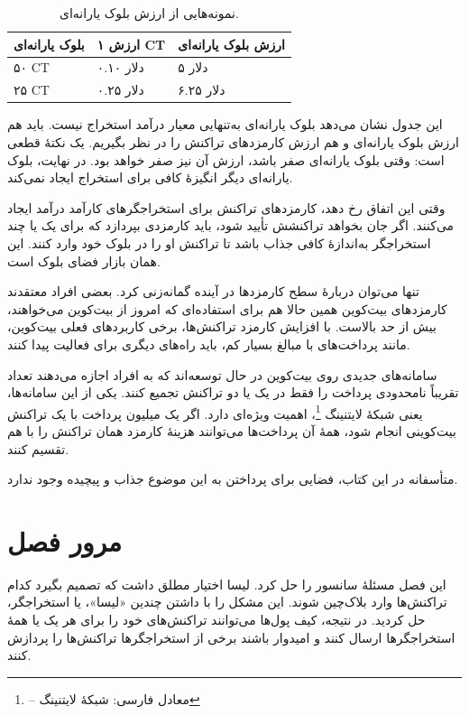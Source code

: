 \documentclass[oneside,a4paper,12pt]{book}
\newcommand{\پاورقی}[2]{%
  \footnote{%
    \scriptsize
    \setlength{\parindent}{0pt}%
    \setlength{\parskip}{0pt}%
    \lr{#1} -- معادل فارسی: #2%
  }}
\newcommand{\قاب}[3][]{%
  \begin{center}
  \fbox{\begin{minipage}{0.78\textwidth}
  \begin{flushright}
  \textbf{#2}\par\smallskip
  #3
  \end{flushright}
  \end{minipage}}
  \end{center}}
\begin{document}
\begin{table}[htbp]
\centering
\caption{نمونه‌هایی از ارزش بلوک یارانه‌ای.}
\label{tab:ch7:4}
{\small\setlength{\tabcolsep}{3pt}
\renewcommand{\arraystretch}{1.2}
\begin{tabular}{|>{\centering\arraybackslash}p{}|>{\centering\arraybackslash}p{}|>{\centering\arraybackslash}p{}|}
\hline
\textbf{بلوک یارانه‌ای} & \textbf{ارزش ۱ CT} & \textbf{ارزش بلوک یارانه‌ای} \\ \hline
۵۰ CT & ۰.۱۰ دلار & ۵ دلار \\ \hline
۲۵ CT & ۰.۲۵ دلار & ۶.۲۵ دلار \\ \hline
\end{tabular}
}
\end{table}
این جدول نشان می‌دهد بلوک یارانه‌ای به‌تنهایی معیار درآمد استخراج نیست. باید هم ارزش بلوک یارانه‌ای و هم ارزش کارمزدهای تراکنش را در نظر بگیریم. یک نکتهٔ قطعی است: وقتی بلوک یارانه‌ای صفر باشد، ارزش آن نیز صفر خواهد بود. در نهایت، بلوک یارانه‌ای دیگر انگیزهٔ کافی برای استخراج ایجاد نمی‌کند.

وقتی این اتفاق رخ دهد، کارمزدهای تراکنش برای استخراجگرهای کارآمد درآمد ایجاد می‌کنند. اگر جان بخواهد تراکنشش تأیید شود، باید کارمزدی بپردازد که برای یک یا چند استخراجگر به‌اندازهٔ کافی جذاب باشد تا تراکنش او را در بلوک خود وارد کنند. این همان بازار فضای بلوک است.

تنها می‌توان دربارهٔ سطح کارمزدها در آینده گمانه‌زنی کرد. بعضی افراد معتقدند کارمزدهای بیت‌کوین همین حالا هم برای استفاده‌ای که امروز از بیت‌کوین می‌خواهند، بیش از حد بالاست. با افزایش کارمزد تراکنش‌ها، برخی کاربردهای فعلی بیت‌کوین، مانند پرداخت‌های با مبالغ بسیار کم، باید راه‌های دیگری برای فعالیت پیدا کنند.

سامانه‌های جدیدی روی بیت‌کوین در حال توسعه‌اند که به افراد اجازه می‌دهند تعداد تقریباً نامحدودی پرداخت را فقط در یک یا دو تراکنش تجمیع کنند. یکی از این سامانه‌ها، یعنی شبکهٔ لایتنینگ\پاورقی{Lightning Network}{شبکهٔ لایتنینگ}، اهمیت ویژه‌ای دارد. اگر یک میلیون پرداخت با یک تراکنش بیت‌کوینی انجام شود، همهٔ آن پرداخت‌ها می‌توانند هزینهٔ کارمزد همان تراکنش را با هم تقسیم کنند.

متأسفانه در این کتاب، فضایی برای پرداختن به این موضوع جذاب و پیچیده وجود ندارد.

\section{مرور فصل}
این فصل مسئلهٔ سانسور را حل کرد. لیسا اختیار مطلق داشت که تصمیم بگیرد کدام تراکنش‌ها وارد بلاک‌چین شوند. این مشکل را با داشتن چندین «لیسا»، یا استخراجگر، حل کردید. در نتیجه، کیف پول‌ها می‌توانند تراکنش‌های خود را برای هر یک یا همهٔ استخراجگرها ارسال کنند و امیدوار باشند برخی از استخراجگرها تراکنش‌ها را پردازش کنند.
\end{document}
